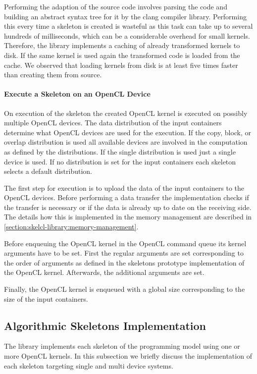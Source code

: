 Performing the adaption of the source code involves parsing the code and building an abstract syntax tree for it by the clang compiler library.
Performing this every time a skeleton is created is wasteful as this task can take up to several hundreds of milliseconds, which can be a considerable overhead for small kernels.
Therefore, the \SkelCL library implements a caching of already transformed kernels to disk.
If the same kernel is used again the transformed code is loaded from the cache.
We observed that loading kernels from disk is at least five times faster than creating them from source.


\paragraph{Execute a Skeleton on an OpenCL Device}
On execution of the skeleton the created OpenCL kernel is executed on possibly multiple OpenCL devices.
The data distribution of the input containers determine what OpenCL devices are used for the execution.
If the copy, block, or overlap distribution is used all available devices are involved in the computation as defined by the distributions.
If the single distribution is used just a single device is used.
If no distribution is set for the input containers each skeleton selects a default distribution.

The first step for execution is to upload the data of the input containers to the OpenCL devices.
Before performing a data transfer the \SkelCL implementation checks if the transfer is necessary or if the data is already up to date on the receiving side.
The details how this is implemented in the memory management are described in \autoref{section:skelcl-library:memory-management}.

Before enqueuing the OpenCL kernel in the OpenCL command queue its kernel arguments have to be set.
First the regular arguments are set corresponding to the order of arguments as defined in the skeletons prototype implementation of the OpenCL kernel.
Afterwards, the additional arguments are set.

Finally, the OpenCL kernel is enqueued with a global size corresponding to the size of the input containers.










\subsection{Algorithmic Skeletons Implementation}
\label{section:skelcl-library:skeletons}
The \SkelCL library implements each skeleton of the \SkelCL programming model using one or more OpenCL kernels.
In this subsection we briefly discuss the implementation of each skeleton targeting single and multi device systems.





